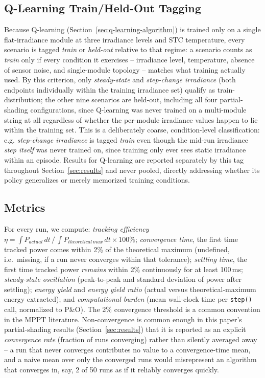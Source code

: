 \subsection{Q-Learning Train/Held-Out Tagging}
\label{sec:ql-tagging}
Because Q-learning (Section~\ref{sec:q-learning-algorithm}) is trained only
on a single flat-irradiance module at three irradiance levels and STC
temperature, every scenario is tagged \emph{train} or \emph{held-out}
relative to that regime: a scenario counts as \emph{train} only if every
condition it exercises -- irradiance level, temperature, absence of sensor
noise, and single-module topology -- matches what training actually used.
By this criterion, only \emph{steady-state} and \emph{step-change
irradiance} (both endpoints individually within the training irradiance
set) qualify as train-distribution; the other nine scenarios are
held-out, including all four partial-shading configurations, since
Q-learning was never trained on a multi-module string at all regardless of
whether the per-module irradiance values happen to lie within the training
set. This is a deliberately coarse, condition-level classification: e.g.
\emph{step-change irradiance} is tagged \emph{train} even though the
mid-run irradiance \emph{step itself} was never trained on, since training
only ever sees static irradiance within an episode. Results for
Q-learning are reported separately by this tag throughout
Section~\ref{sec:results} and never pooled, directly addressing whether
its policy generalizes or merely memorized training conditions.

\subsection{Metrics}
For every run, we compute: \emph{tracking efficiency}
$\eta=\int P_{actual}\,dt \,/\, \int P_{theoretical\,max}\,dt \times 100\%$;
\emph{convergence time}, the first time tracked power comes within 2\% of
the theoretical maximum (undefined, i.e.\ missing, if a run never
converges within that tolerance); \emph{settling time}, the first time
tracked power \emph{remains} within 2\% continuously for at least 100\,ms;
\emph{steady-state oscillation} (peak-to-peak and standard deviation of
power after settling); \emph{energy yield} and \emph{energy yield ratio}
(actual versus theoretical-maximum energy extracted); and
\emph{computational burden} (mean wall-clock time per \texttt{step()} call,
normalized to P\&O). The 2\% convergence threshold is a common convention
in the MPPT literature. Non-convergence is common enough in this paper's
partial-shading results (Section~\ref{sec:results}) that it is reported as
an explicit \emph{convergence rate} (fraction of runs converging) rather
than silently averaged away -- a run that never converges contributes no
value to a convergence-time mean, and a naive mean over only the converged
runs would misrepresent an algorithm that converges in, say, 2 of 50 runs
as if it reliably converges quickly.
